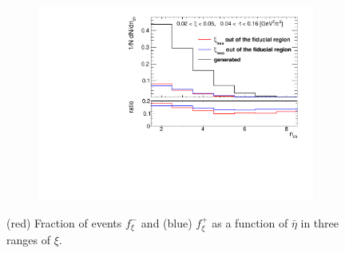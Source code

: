 \begin{figure}[h!]
\begin{subfigure}{.49\textwidth}
		\includegraphics[width=\textwidth,page=9]{chapters/chrgSTAR/img/xiMigration/xi.pdf}
	\end{subfigure}
	\begin{minipage}{.49\textwidth}
		\caption{(red) Fraction of events $f_{\xi}^-$ and (blue) $f_{\xi}^+$  as a function of $\bar{\eta}$ in three ranges of $\xi$.}
		\label{fig:xi_correction_eta}
	\end{minipage}
	
\end{figure}